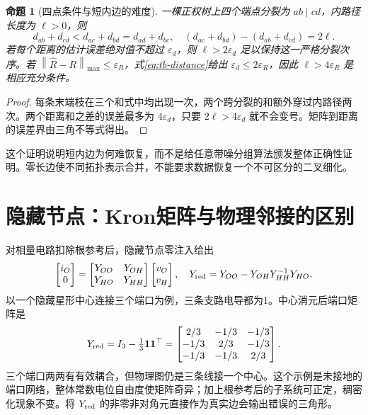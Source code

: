 \documentclass[UTF8,11pt,fontset=fandol,openany,oneside]{ctexbook}
\newcommand{\norm}[1]{\left\lVert#1\right\rVert}
\newtheorem{proposition}[theorem]{命题}
\theoremstyle{definition}
\theoremstyle{remark}
\numberwithin{equation}{chapter}
\begin{document}
\begin{proposition}[四点条件与短内边的难度]
一棵正权树上四个端点分裂为 $ab\mid cd$，内路径长度为 $\ell>0$，则
\begin{equation}
 d_{ab}+d_{cd}<d_{ac}+d_{bd}=d_{ad}+d_{bc},
 \quad (d_{ac}+d_{bd})-(d_{ab}+d_{cd})=2\ell.
\end{equation}
若每个距离的估计误差绝对值不超过 $\varepsilon_d$，则 $\ell>2\varepsilon_d$ 足以保持这一严格分裂次序。若 $\norm{\widehat R-R}_{\max}\leq\varepsilon_R$，式\eqref{eq:tb-distance}给出 $\varepsilon_d\leq2\varepsilon_R$，因此 $\ell>4\varepsilon_R$ 是相应充分条件。
\end{proposition}
\begin{proof}
每条末端枝在三个和式中均出现一次，两个跨分裂的和额外穿过内路径两次。两个距离和之差的误差最多为 $4\varepsilon_d$，只要 $2\ell>4\varepsilon_d$ 就不会变号。矩阵到距离的误差界由三角不等式得出。
\end{proof}
这个证明说明短内边为何难恢复，而不是给任意带噪分组算法颁发整体正确性证明。零长边使不同拓扑表示合并，不能要求数据恢复一个不可区分的二叉细化。

\section{隐藏节点：Kron矩阵与物理邻接的区别}
对相量电路扣除根参考后，隐藏节点零注入给出
\begin{equation}
 \begin{bmatrix}i_O\\0\end{bmatrix}
 =\begin{bmatrix}Y_{OO}&Y_{OH}\\Y_{HO}&Y_{HH}\end{bmatrix}
 \begin{bmatrix}v_O\\v_H\end{bmatrix},\quad
 Y_{\rm red}=Y_{OO}-Y_{OH}Y_{HH}^{-1}Y_{HO}.
\end{equation}
以一个隐藏星形中心连接三个端口为例，三条支路电导都为1。中心消元后端口矩阵是
\begin{equation}
 Y_{\rm red}=I_3-\tfrac13\mathbf1\mathbf1^\top
 =\begin{bmatrix}2/3&-1/3&-1/3\\-1/3&2/3&-1/3\\-1/3&-1/3&2/3\end{bmatrix}.
\end{equation}
三个端口两两有有效耦合，但物理图仍是三条线接一个中心。这个示例是未接地的端口网络，整体常数电位自由度使矩阵奇异；加上根参考后的子系统可正定，稠密化现象不变。将 $Y_{\rm red}$ 的非零非对角元直接作为真实边会输出错误的三角形。
\end{document}
